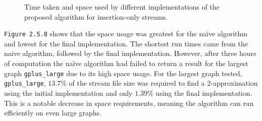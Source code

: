 \documentclass[11pt,twoside,a4paper]{report}
\begin{document}
\begin{figure}[H]
	\label{Figure 12}
	\newline
	\caption{Time taken and space used by different implementations of the proposed algorithm for insertion-only streams.}
\end{figure}

\par \texttt{Figure 2.5.8} shows that the space usage was greatest for the naïve algorithm and lowest for the final implementation. The shortest run times came from the naive algorithm, followed by the final implementation. However, after three hours of computation the naïve algorithm had failed to return a result for the largest graph \texttt{gplus\_large} due to its high space usage. For the largest graph tested, \texttt{gplus\_large}, $13.7\%$ of the stream file size was required to find a 2-approximation using the initial implementation and only $1.39\%$ using the final implementation. This is a notable decrease in space requirements, meaning the algorithm can run efficiently on even large graphs.
\end{document}
